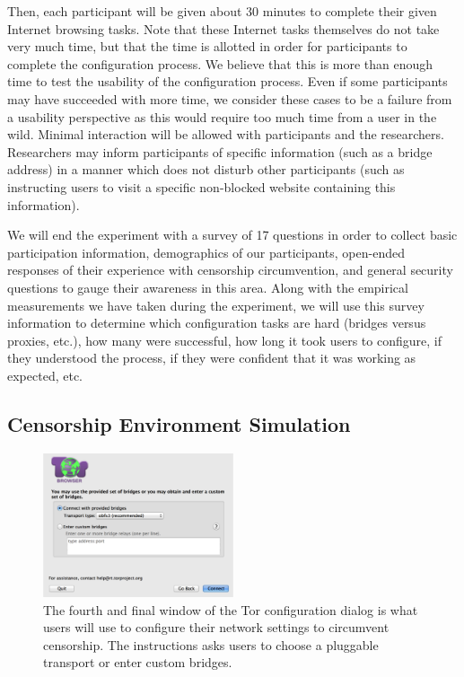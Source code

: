 \documentclass[letterpaper,twocolumn,11pt]{article}
\begin{document}
Then, each participant will be given about 30 minutes to complete their given Internet browsing tasks. 
Note that these Internet tasks themselves do not take very much time, but that the time is allotted in order
for participants to complete the configuration process. We believe that this is more than enough time to 
test the usability of the configuration process. Even if some participants may have succeeded with more 
time, we consider these cases to be a failure from a usability perspective as this would require too much
time from a user in the wild. Minimal interaction will be allowed with participants and the researchers. 
Researchers may inform participants of specific information (such as a bridge address) in a manner 
which does not disturb other participants (such as instructing users to visit a specific non-blocked website 
containing this information). 

We will end the experiment with a survey of 17 questions in order to collect basic participation information, 
demographics of our participants, open-ended responses of their experience with censorship circumvention,
and general security questions to gauge their awareness in this area. Along with the empirical measurements 
we have taken during the experiment, we will use this survey information to determine which configuration tasks are hard (bridges versus proxies, etc.), how many were successful, how long it took users to configure, if they understood the process, if they were confident that it was working as expected, etc.  

\subsection{Censorship Environment Simulation}

\begin{figure}[t]
\includegraphics[width=0.5\textwidth]{configuration-dialog.png}
\caption{The fourth and final window of the Tor configuration dialog is what users will use to 
configure their network settings to circumvent censorship. The instructions asks users to 
choose a pluggable transport or enter custom bridges.}
\label{dialog}
\end{figure}
\end{document}
